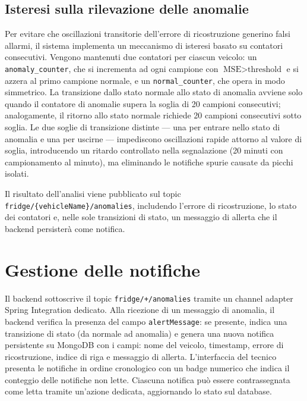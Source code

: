 \subsection{Isteresi sulla rilevazione delle anomalie}

Per evitare che oscillazioni transitorie dell'errore di ricostruzione 
generino falsi allarmi, il sistema implementa un meccanismo di isteresi 
basato su contatori consecutivi. Vengono mantenuti due contatori per 
ciascun veicolo: un \texttt{anomaly\_counter}, che si incrementa ad ogni 
campione con $\text{MSE} > \text{threshold}$ e si azzera al primo campione 
normale, e un \texttt{normal\_counter}, che opera in modo simmetrico. 
La transizione dallo stato normale allo stato di anomalia avviene solo 
quando il contatore di anomalie supera la soglia di 20 campioni consecutivi; 
analogamente, il ritorno allo stato normale richiede 20 campioni consecutivi 
sotto soglia. Le due soglie di transizione distinte — una per entrare nello stato 
di anomalia e una per uscirne — impediscono oscillazioni rapide 
attorno al valore di soglia, introducendo un ritardo controllato 
nella segnalazione (20 minuti con campionamento al minuto), ma 
eliminando le notifiche spurie causate da picchi isolati.

Il risultato dell'analisi viene pubblicato sul topic 
\texttt{fridge/\{vehicleName\}/anomalies}, includendo l'errore di 
ricostruzione, lo stato dei contatori e, nelle sole transizioni di stato, 
un messaggio di allerta che il backend persisterà come notifica.
\section{Gestione delle notifiche}
\label{sec:notifiche}

Il backend sottoscrive il topic \texttt{fridge/+/anomalies} tramite un channel adapter Spring Integration dedicato. 
Alla ricezione di un messaggio di anomalia, il backend verifica la presenza del campo \texttt{alertMessage}: se presente, indica una transizione di stato (da normale ad anomalia) e genera una nuova notifica persistente su MongoDB con i campi: nome del veicolo, timestamp, errore di ricostruzione, indice di riga e messaggio di allerta. 
L'interfaccia del tecnico presenta le notifiche in ordine cronologico con un badge numerico che indica il conteggio delle notifiche non lette. Ciascuna notifica può essere contrassegnata come letta tramite un'azione dedicata, aggiornando lo stato sul database. 


